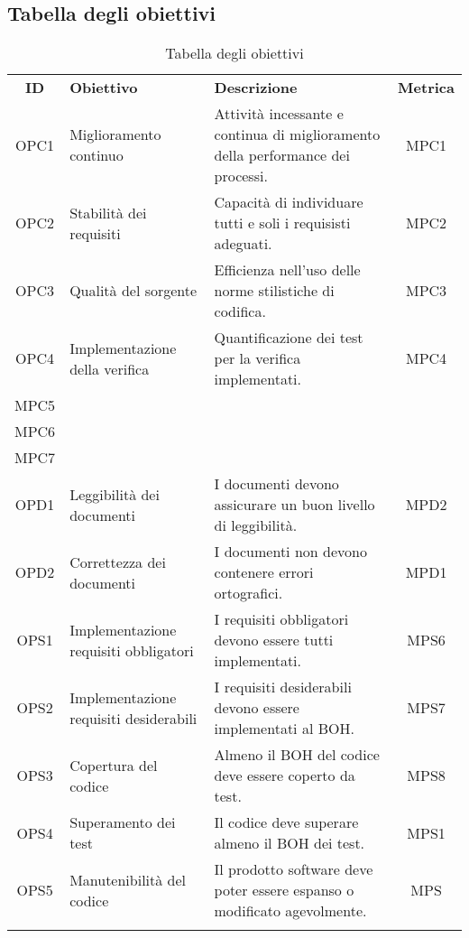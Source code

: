\subsection{Tabella degli obiettivi}

\begin{longtable}{| c | p{5cm} | p{5cm} | c |}
	\rowcolor{LightBlue}
	\color{white}\bfseries ID & \color{white}\bfseries Obiettivo & \color{white}\bfseries Descrizione & \color{white}\bfseries Metrica \\[0.25cm]
	OPC1 & Miglioramento continuo & Attività incessante e continua di miglioramento della performance dei processi. & MPC1 \\ \hline
	OPC2 & Stabilità dei requisiti & Capacità di individuare tutti e soli i requisisti adeguati. & MPC2 \\ \hline
	OPC3 & Qualità del sorgente & Efficienza nell'uso delle norme stilistiche di codifica. & MPC3 \\ \hline
	OPC4 & Implementazione della verifica & Quantificazione dei test per la verifica implementati. & MPC4 \\ MPC5 \\MPC6 \\MPC7 \\ \hline
	OPD1 & Leggibilità dei documenti & I documenti devono assicurare un buon livello di leggibilità. & MPD2 \\ \hline
	OPD2 & Correttezza dei documenti & I documenti non devono contenere errori ortografici. & MPD1 \\ \hline
	OPS1 & Implementazione requisiti obbligatori & I requisiti obbligatori devono essere tutti implementati. & MPS6 \\ \hline
	OPS2 & Implementazione requisiti desiderabili & I requisiti desiderabili devono essere implementati al BOH. & MPS7 \\ \hline
	OPS3 & Copertura del codice & Almeno il BOH del codice deve essere coperto da test. & MPS8 \\ \hline
	OPS4 & Superamento dei test & Il codice deve superare almeno il BOH dei test. & MPS1 \\ \hline
	OPS5 & Manutenibilità del codice & Il prodotto software deve poter essere espanso o modificato agevolmente. & MPS \\ \hline 
	\caption{Tabella degli obiettivi} 
\end{longtable}